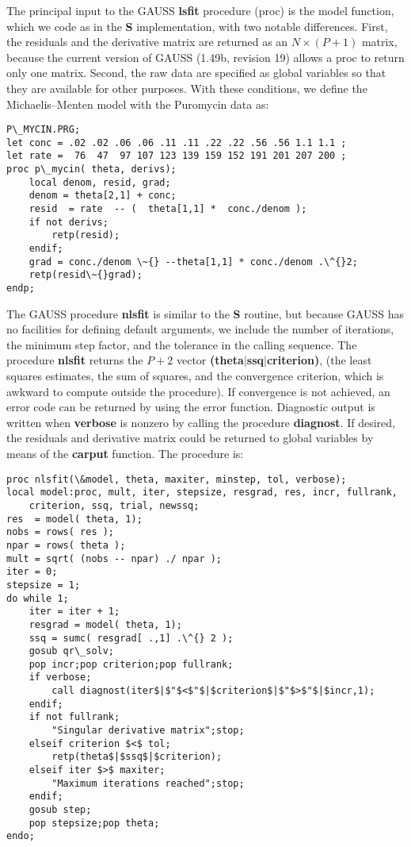 {The principal input to the GAUSS {\bf lsfit}
procedure (proc) is the model function, which we code as in the
{\bf S} implementation, with two notable differences.
First, the residuals and the derivative matrix are returned as an $N
\times ( P+1 )$ matrix, because the current version of GAUSS
(1.49b, revision 19) allows a proc to return only one matrix.  Second,
the raw data are specified as global variables so that they are
available for other purposes.  With these conditions, we define the
Michaelis--Menten model with the Puromycin data as:
\begin{verbatim}
P\_MYCIN.PRG;
let conc = .02 .02 .06 .06 .11 .11 .22 .22 .56 .56 1.1 1.1 ;
let rate =  76  47  97 107 123 139 159 152 191 201 207 200 ;
proc p\_mycin( theta, derivs);
    local denom, resid, grad;
    denom = theta[2,1] + conc;
    resid  = rate  -- (  theta[1,1] *  conc./denom );
    if not derivs;
        retp(resid);
    endif;
    grad = conc./denom \~{} --theta[1,1] * conc./denom .\^{}2;
    retp(resid\~{}grad);
endp;

\end{verbatim}

The GAUSS procedure {\bf nlsfit} is similar to the {\bf S} routine, but
because GAUSS has no facilities for defining default arguments, we
include the number of iterations,
the minimum step factor, and the tolerance in the calling sequence.  The
procedure {\bf nlsfit} returns the $P+2$ vector
{\bf (theta$|$ssq$|$criterion)}, (the least squares estimates,
the sum of squares, and the convergence criterion, which is awkward to
compute outside the procedure).  If convergence is not achieved, an
error code can be returned by using the error function.  Diagnostic
output is written when {\bf verbose} is nonzero by calling
the procedure {\bf diagnost}.  If desired, the residuals and
derivative matrix could be returned to global variables by means of
the {\bf carput} function.  The procedure is:
\begin{verbatim}
proc nlsfit(\&model, theta, maxiter, minstep, tol, verbose);
local model:proc, mult, iter, stepsize, resgrad, res, incr, fullrank,
    criterion, ssq, trial, newssq;
res  = model( theta, 1);
nobs = rows( res );
npar = rows( theta );
mult = sqrt( (nobs -- npar) ./ npar );
iter = 0;
stepsize = 1;
do while 1;
    iter = iter + 1;
    resgrad = model( theta, 1);
    ssq = sumc( resgrad[ .,1] .\^{} 2 );
    gosub qr\_solv;
    pop incr;pop criterion;pop fullrank;
    if verbose;
        call diagnost(iter$|$"$<$"$|$criterion$|$"$>$"$|$incr,1);
    endif;
    if not fullrank;
        "Singular derivative matrix";stop;
    elseif criterion $<$ tol;
        retp(theta$|$ssq$|$criterion);
    elseif iter $>$ maxiter;
        "Maximum iterations reached";stop;
    endif;
    gosub step;
    pop stepsize;pop theta;
endo;
\end{verbatim}

}
